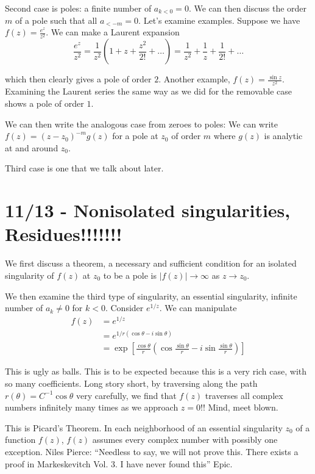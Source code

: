 \documentclass[10pt]{report}
\newcommand{\abs}[1]{\left|#1\right|}
\begin{document}
Second case is poles: a finite number of $a_{k < 0} = 0$. We can then discuss the order $m$ of a pole such that all $a_{<-m} = 0$. Let's examine examples. Suppose we have $f(z) = \frac{e^z}{z^2}$. We can make a Laurent expansion
$$\frac{e^z}{z^2} = \frac{1}{z^2}\left( 1+z+\frac{z^2}{2!}+\dots \right) = \frac{1}{z^2} + \frac{1}{z} + \frac{1}{2!} +\dots$$

which then clearly gives a pole of order $2$. Another example, $f(z) = \frac{\sin z}{z^2}$. Examining the Laurent series the same way as we did for the removable case shows a pole of order $1$. 

We can then write the analogous case from zeroes to poles: We can write $f(z) = (z-z_0)^{-m}g(z)$ for a pole at $z_0$ of order $m$ where $g(z)$ is analytic at and around $z_0$.

Third case is one that we talk about later.

\chapter{11/13 - Nonisolated singularities, Residues!!!!!!!}

We first discuss a theorem, a necessary and sufficient condition for an isolated singularity of $f(z)$ at $z_0$ to be a pole is $\abs{f(z)} \to \infty$ as $z \to z_0$.

We then examine the third type of singularity, an essential singularity, infinite number of $a_k \neq 0$ for $k < 0$. Consider $e^{1/z}$. We can manipulate
\begin{align*}
    f(z) &= e^{1/z}\\
    &= e^{1/r\left( \cos \theta - i\sin \theta \right)}\\
    &= \exp\left[ \frac{\cos \theta}{r}\left( \cos \frac{\sin \theta}{r} - i\sin \frac{\sin \theta}{r} \right) \right]
\end{align*}

This is ugly as balls. This is to be expected because this is a very rich case, with so many coefficients. Long story short, by traversing along the path $r(\theta) = C^{-1} \cos \theta$ very carefully, we find that $f(z)$ traverses all complex numbers infinitely many times as we approach $z=0$!! Mind, meet blown. 

This is Picard's Theorem. In each neighborhood of an essential singularity $z_0$ of a function $f(z)$, $f(z)$ assumes every complex number with possibly one exception. Niles Pierce: ``Needless to say, we will not prove this. There exists a proof in Markeskevitch Vol. 3. I have never found this'' Epic.
\end{document}
